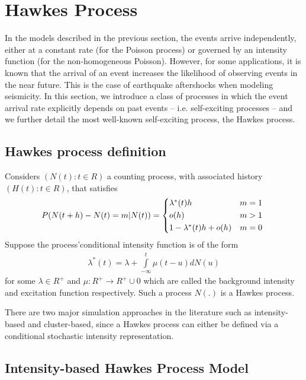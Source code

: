 \chapter{Hawkes Process}
In the models described in the previous section, the events arrive independently, either at a constant rate (for the Poisson process) or governed by an intensity function (for the non-homogeneous Poisson). However, for some applications, it is known that the arrival of an event increases the likelihood of observing events in the near future. This is the case of earthquake aftershocks when modeling seismicity. In this section, we introduce a class of processes in which the event arrival rate explicitly depends on past events – i.e. self-exciting processes – and we further detail the most well-known self-exciting process, the Hawkes process.
\section{Hawkes process definition}
\begin{Definition}{}	
	Considers $(N(t): t\in R)$ a counting process, with associated history $(H(t):
	t \in R)$, that satisfies
	\begin{align*}
	P(N(t + h) - N(t) = m \rvert N(t)) = 
	\begin{cases*}
	\lambda^{*}(t)h & $m = 1$ \\
	o(h) & $m > 1$  \\
	1-\lambda^{*}(t)h + o(h) & $ m = 0$  
	\end{cases*}  
	\end{align*}
Suppose the process’conditional intensity function is of the form
	\begin{align*}
	\lambda^{*}(t) = \lambda + \displaystyle\int\limits_{-\infty}^{t} \mu(t-u)dN(u) 
	\end{align*}
for some $\lambda \in R^{+}$ and $\mu: R^{+} \rightarrow R^{+} \cup {0}$ which are called the background intensity and excitation function respectively. Such a process $N(.)$ is a Hawkes process.
\end{Definition}

There are two major simulation approaches in the literature such as intensity-based and cluster-based, since a Hawkes process can either be defined via a conditional stochastic intensity representation.

\section{Intensity-based Hawkes Process Model}

